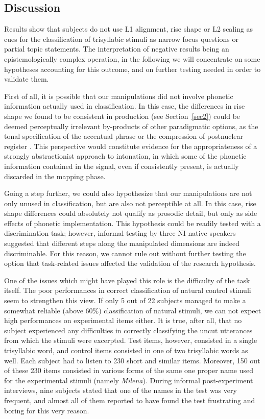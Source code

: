 \subsection{Discussion}\label{sec323}
Results show that subjects do not use L1 alignment, rise shape or L2 scaling as cues for the classification of trisyllabic stimuli as narrow focus questions or partial topic statements. The interpretation of negative results being an epistemologically complex operation, in the following we will concentrate on some hypotheses accounting for this outcome, and on further testing needed in order to validate them.

First of all, it is possible that our manipulations did not involve phonetic information actually used in classification. In this case, the differences in rise shape we found to be consistent in production (see Section~\ref{sec2}) could be deemed perceptually irrelevant by-products of other paradigmatic options, as the tonal specification of the accentual phrase \citep{petrone2008tonal} or the compression of postnuclear register \citep{dimperio2011phrasing}. This perspective would constitute evidence for the appropriateness of a strongly abstractionist approach to intonation, in which some of the phonetic information contained in the signal, even if consistently present, is actually discarded in the mapping phase.

Going a step further, we could also hypothesize that our manipulations are not only unused in classification, but are also not perceptible at all. In this case, rise shape differences could absolutely not qualify as prosodic detail, but only as side effects of phonetic implementation. This hypothesis could be readily tested with a discrimination task; however, informal testing by three NI native speakers suggested that different steps along the manipulated dimensions are indeed discriminable. For this reason, we cannot rule out without further testing the option that task-related issues affected the validation of the research hypothesis. 

One of the issues which might have played this role is the difficulty of the task itself. The poor performances in correct classification of natural control stimuli seem to strengthen this view. If only 5 out of 22 subjects managed to make a somewhat reliable (above 60\%) classification of natural stimuli, we can not expect high performances on experimental items either. It is true, after all, that no subject experienced any difficulties in correctly classifying the uncut utterances from which the stimuli were excerpted. Test items, however, consisted in a single trisyllabic word, and control items consisted in one of two trisyllabic words as well. Each subject had to listen to 230 short and similar items. Moreover, 150 out of these 230 items consisted in various forms of the same one proper name used for the experimental stimuli (namely \textit{Milena}). During informal post-experiment interviews, nine subjects stated that one of the names in the test was very frequent, and almost all of them reported to have found the test frustrating and boring for this very reason.

